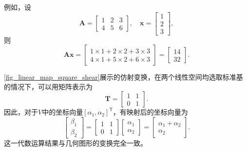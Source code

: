 例如，设
\[
    \mathbf{A}=
    \begin{bmatrix}
        1 & 2 & 3 \\
        4 & 5 & 6
    \end{bmatrix},
    \quad
    \bm x=
    \begin{bmatrix}
        1 \\
        2 \\
        3
    \end{bmatrix},
\]
则
\[
    \mathbf{A}\bm x=
    \begin{bmatrix}
        1\times 1 + 2\times 2 + 3\times 3 \\
        4\times 1 + 5\times 2 + 6\times 3
    \end{bmatrix}=
    \begin{bmatrix}14 \\
        32
    \end{bmatrix}.
\]

\cref{fig_linear_map_square_shear}展示的仿射变换，在两个线性空间均选取标准基的情况下，可以用矩阵表示为
\[
    \mathbf{T}=
    \begin{bmatrix}
        1 & 1 \\
        0 & 1
    \end{bmatrix}.
\]
因此，对于\( V \)中的坐标向量\( [\alpha_1, \alpha_2]^{\mathsf{T}} \)，有映射后的坐标向量为
\[
    \begin{bmatrix}
        \beta_1 \\
        \beta_2
    \end{bmatrix}=
    \begin{bmatrix}
        1 & 1 \\
        0 & 1
    \end{bmatrix}
    \begin{bmatrix}
        \alpha_1 \\
        \alpha_2
    \end{bmatrix}=
    \begin{bmatrix}
        \alpha_1 + \alpha_2 \\
        \alpha_2
    \end{bmatrix}.
\]
这一代数运算结果与几何图形的变换完全一致。


